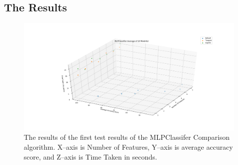 \documentclass[a4paper, 12pt]{article}
\begin{document}
\subsection{The Results}
\begin{figure}[h]
\centering
\includegraphics[scale=0.37]{Test_1}
\caption{The results of the first test results of the MLPClassifer Comparison algorithm. X--axis is Number of Features, Y--axis is average accuracy score, and Z--axis is Time Taken in seconds.}
\end{figure}
\end{document}
